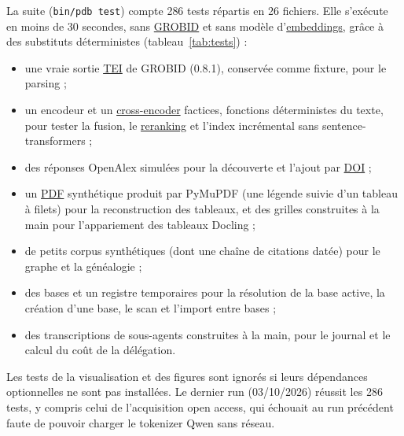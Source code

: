 \documentclass[11pt,a4paper]{article}
\newcommand{\cmd}[1]{\texttt{#1}}
\newcommand{\gl}[2]{\hyperlink{gl:#1}{\textcolor{glcolor}{#2}}}
\begin{document}
La suite (\cmd{bin/pdb test}) compte 286 tests répartis en 26 fichiers. Elle s'exécute en
moins de 30 secondes, sans
\gl{GROBID}{GROBID} et sans modèle d'\gl{embedding}{embeddings}, grâce à des substituts déterministes
(tableau~\ref{tab:tests}) :
\begin{itemize}
  \item une vraie sortie \gl{TEI}{TEI} de GROBID (0.8.1), conservée comme fixture, pour le parsing ;
  \item un encodeur et un \gl{crossenc}{cross-encoder} factices, fonctions déterministes du texte, pour
    tester la fusion, le \gl{reranking}{reranking} et l'index incrémental sans sentence-transformers ;
  \item des réponses OpenAlex simulées pour la découverte et l'ajout par \gl{DOI}{DOI} ;
  \item un \gl{PDF}{PDF} synthétique produit par PyMuPDF (une légende suivie d'un tableau à filets)
    pour la reconstruction des tableaux, et des grilles construites à la main pour
    l'appariement des tableaux Docling ;
  \item de petits corpus synthétiques (dont une chaîne de citations datée) pour le graphe et
    la généalogie ;
  \item des bases et un registre temporaires pour la résolution de la base active, la
    création d'une base, le scan et l'import entre bases ;
  \item des transcriptions de sous-agents construites à la main, pour le journal et le calcul
    du coût de la délégation.
\end{itemize}
Les tests de la visualisation et des figures sont ignorés si leurs dépendances optionnelles
ne sont pas installées. Le dernier run (03/10/2026) réussit les 286 tests, y compris celui de
l'acquisition open access, qui échouait au run précédent faute de pouvoir charger le
tokenizer Qwen sans réseau.
\end{document}
